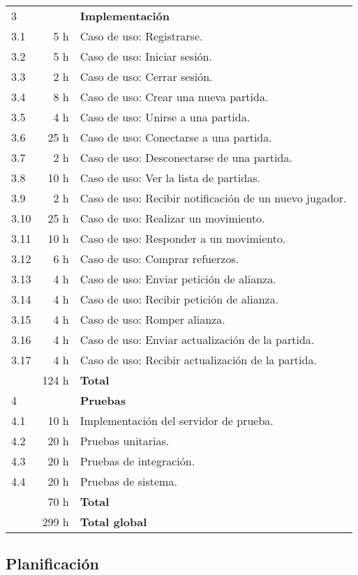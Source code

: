 {\begin{longtable}[c]{lrl}
3 & & \textbf{Implementación} \\
3.1  &  5 h & Caso de uso: Registrarse. \\
3.2  &  5 h & Caso de uso: Iniciar sesión. \\
3.3  &  2 h & Caso de uso: Cerrar sesión. \\
3.4  &  8 h & Caso de uso: Crear una nueva partida. \\
3.5  &  4 h & Caso de uso: Unirse a una partida. \\
3.6  & 25 h & Caso de uso: Conectarse a una partida. \\
3.7  &  2 h & Caso de uso: Desconectarse de una partida. \\
3.8  & 10 h & Caso de uso: Ver la lista de partidas. \\
3.9  &  2 h & Caso de uso: Recibir notificación de un nuevo jugador. \\
3.10 & 25 h & Caso de uso: Realizar un movimiento. \\
3.11 & 10 h & Caso de uso: Responder a un movimiento. \\
3.12 &  6 h & Caso de uso: Comprar refuerzos. \\
3.13 &  4 h & Caso de uso: Enviar petición de alianza. \\
3.14 &  4 h & Caso de uso: Recibir petición de alianza. \\
3.15 &  4 h & Caso de uso: Romper alianza. \\
3.16 &  4 h & Caso de uso: Enviar actualización de la partida. \\
3.17 &  4 h & Caso de uso: Recibir actualización de la partida. \\
    & 124 h & \textbf{Total} \\
\hline

4 & & \textbf{Pruebas} \\
4.1 & 10 h & Implementación del servidor de prueba. \\
4.2 & 20 h & Pruebas unitarias. \\
4.3 & 20 h & Pruebas de integración. \\
4.4 & 20 h & Pruebas de sistema. \\
    & 70 h & \textbf{Total} \\
\hline
   & 299 h & \textbf{Total global} \\
\hline
\end{longtable}
}

\subsection{Planificación}

